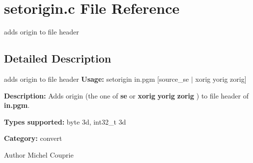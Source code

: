 \section{setorigin.c File Reference}
\label{setorigin_8c}


adds origin to file header  




\subsection{Detailed Description}
adds origin to file header {\bfseries Usage:} setorigin in.pgm [source\_\-se $|$ xorig yorig zorig]

{\bfseries Description:} Adds origin (the one of {\bfseries se} or {\bfseries xorig} {\bfseries yorig} {\bfseries zorig} ) to file header of {\bfseries in.pgm}.

{\bfseries Types supported:} byte 3d, int32\_\-t 3d

{\bfseries Category:} convert

\begin{DoxyAuthor}{Author}
Michel Couprie 
\end{DoxyAuthor}
